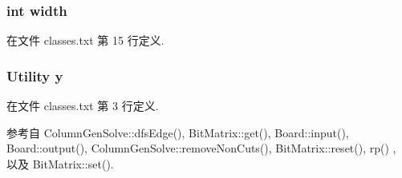 \subsubsection[{\texorpdfstring{width}{width}}]{\setlength{\rightskip}{0pt plus 5cm}int width}\hypertarget{classes_8txt_a2474a5474cbff19523a51eb1de01cda4}{}\label{classes_8txt_a2474a5474cbff19523a51eb1de01cda4}


在文件 classes.\+txt 第 15 行定义.

\subsubsection[{\texorpdfstring{y}{y}}]{\setlength{\rightskip}{0pt plus 5cm}Utility y}\hypertarget{classes_8txt_a52673b1e0cce0104e52dcd12727f211e}{}\label{classes_8txt_a52673b1e0cce0104e52dcd12727f211e}


在文件 classes.\+txt 第 3 行定义.



参考自 Column\+Gen\+Solve\+::dfs\+Edge(), Bit\+Matrix\+::get(), Board\+::input(), Board\+::output(), Column\+Gen\+Solve\+::remove\+Non\+Cuts(), Bit\+Matrix\+::reset(), rp() , 以及 Bit\+Matrix\+::set().

